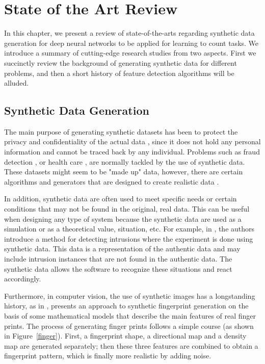 \newpage
\chapter{State of the Art Review}
\label{sec:stateoftheart}

In this chapter, we present a review of state-of-the-arts regarding synthetic data generation for deep neural networks to be applied for learning to count tasks. We introduce a summary of cutting-edge research studies from two aspects. First we succinctly review the background of generating synthetic data for different problems, and then a short history of feature detection algorithms will be alluded.

\section{Synthetic Data Generation} 

The main purpose of generating synthetic datasets has been to protect the privacy and confidentiality of the actual data \cite{yao2015synthetic,phua2010comprehensive}, since it does not hold any personal information and cannot be traced back by any individual. Problems such as fraud detection \cite{phua2010comprehensive}, or health care \cite{yao2015synthetic}, are normally tackled by the use of synthetic data. These datasets might seem to be "made up" data, however, there are certain algorithms and generators that are designed to create realistic data \cite{yao2015synthetic,arasu2012synthetic}. 

In addition, synthetic data are often used to meet specific needs or certain conditions that may not be found in the original, real data. This can be useful when designing any type of system because the synthetic data are used as a simulation or as a theoretical value, situation, etc. For example, in \cite{hofmeyr1998intrusion}, the authors introduce a method for detecting intrusions where the experiment is done using synthetic data. This data is a representation of the authentic data and may include intrusion instances that are not found in the authentic data. The synthetic data allows the software to recognize these situations and react accordingly.

Furthermore, in computer vision, the use of synthetic images has a longstanding history, as in \citeyear{cappelli2000synthetic}, \citealt*{cappelli2000synthetic} presents an approach to synthetic fingerprint generation on the basis of some mathematical models that describe the main features of real finger prints. The process of generating finger prints follows a simple course (as shown in Figure~\ref{finger}). First, a fingerprint shape, a directional map and a density map are generated separately; then these three features are combined to obtain a fingerprint pattern, which is finally more realistic by adding noise.

